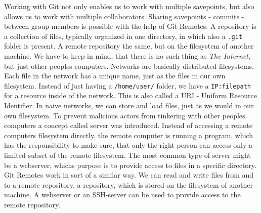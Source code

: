 \documentclass{dcbl/challenge}
\begin{document}
Working with Git not only enables us to work with multiple savepoints, but also allows us to work with multiple collaborators.
Sharing savepoints - commits - between group-members is possible with the help of Git Remotes.
A repository is a collection of files, typically organized in one directory, in which also a \texttt{.git} folder is present.
A remote repository the same, but on the filesystem of another machine.
We have to keep in mind, that there is no such thing as \textit{The Internet}, but just other peoples computers.
Networks are basically distributed filesystems.
Each file in the network has a unique name, just as the files in our own filesystem.
Instead of just having a \texttt{/home/user/} folder, we have a \texttt{IP:filepath} for a resource inside of the network.
This is also called a URI - Uniform Resource Identifier.
In naive networks, we can store and load files, just as we would in our own filesystem.
To prevent malicious actors from tinkering with other peoples computers a concept called server was introduced. 
Instead of accessing a remote computers filesystem directly, the remote computer is running a program, which has the responsibility to make sure, that only the right person can access only a limited subset of the remote filesystem.
The most common type of server might be a webserver, whichs purpose is to provide access to files in a specific directory.
Git Remotes work in sort of a similar way.
We can read and write files from and to a remote repository, a repository, which is stored on the filesystem of another machine.
A webserver or an SSH-server can be used to provide access to the remote repository.
\end{document}
